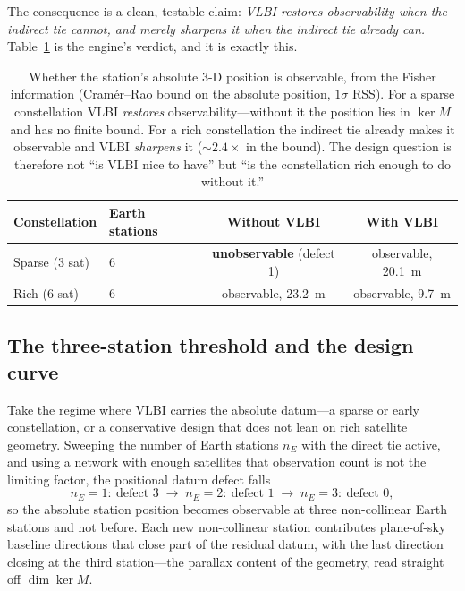 The consequence is a clean, testable claim: \emph{VLBI restores observability when
the indirect tie cannot, and merely sharpens it when the indirect tie already can.}
Table~\ref{tab:restore} is the engine's verdict, and it is exactly this.

\begin{table}[t]
\centering
\small
\begin{tabular}{llcc}
\toprule
Constellation & Earth stations & Without VLBI & With VLBI \\
\midrule
Sparse (3 sat) & 6 & \textbf{unobservable} (defect 1) & observable, \SI{20.1}{\meter} \\
Rich (6 sat)   & 6 & observable, \SI{23.2}{\meter}   & observable, \SI{9.7}{\meter} \\
\bottomrule
\end{tabular}
\caption{Whether the station's absolute 3-D position is observable, from the
Fisher information (Cram\'er--Rao bound on the absolute position, $1\sigma$ RSS).
For a sparse constellation VLBI \emph{restores} observability---without it the
position lies in $\ker M$ and has no finite bound. For a rich constellation the
indirect tie already makes it observable and VLBI \emph{sharpens} it
($\sim\!2.4\times$ in the bound). The design question is therefore not ``is VLBI
nice to have'' but ``is the constellation rich enough to do without it.''}
\label{tab:restore}
\end{table}

\subsection{The three-station threshold and the design curve}

Take the regime where VLBI carries the absolute datum---a sparse or early
constellation, or a conservative design that does not lean on rich satellite
geometry. Sweeping the number of Earth stations $n_E$ with the direct tie active,
and using a network with enough satellites that observation count is not the
limiting factor, the positional datum defect falls
\begin{equation}
  n_E = 1:\ \text{defect } 3 \;\longrightarrow\;
  n_E = 2:\ \text{defect } 1 \;\longrightarrow\;
  n_E = 3:\ \text{defect } 0,
  \label{eq:defect}
\end{equation}
so the absolute station position becomes observable at three non-collinear Earth
stations and not before. Each new non-collinear station contributes plane-of-sky
baseline directions that close part of the residual datum, with the last direction
closing at the third station---the parallax content of the geometry, read straight
off $\dim\ker M$.


